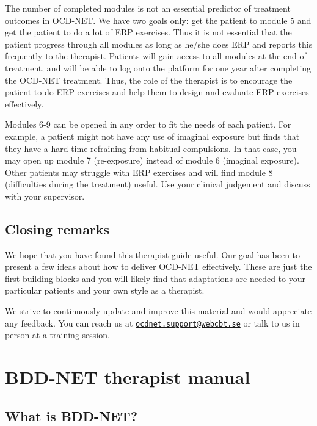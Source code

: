 \documentclass[]{book}
\theoremstyle{definition}
\theoremstyle{definition}
\theoremstyle{definition}
\theoremstyle{remark}
\begin{document}
The number of completed modules is not an essential predictor of
treatment outcomes in OCD-NET. We have two goals only: get the patient
to module 5 and get the patient to do a lot of ERP exercises. Thus it is
not essential that the patient progress through all modules as long as
he/she does ERP and reports this frequently to the therapist. Patients
will gain access to all modules at the end of treatment, and will be
able to log onto the platform for one year after completing the OCD-NET
treatment. Thus, the role of the therapist is to encourage the patient
to do ERP exercises and help them to design and evaluate ERP exercises
effectively.

Modules 6-9 can be opened in any order to fit the needs of each patient.
For example, a patient might not have any use of imaginal exposure but
finds that they have a hard time refraining from habitual compulsions.
In that case, you may open up module 7 (re-exposure) instead of module 6
(imaginal exposure). Other patients may struggle with ERP exercises and
will find module 8 (difficulties during the treatment) useful. Use your
clinical judgement and discuss with your supervisor.

\hypertarget{closing-remarks}{%
\section{Closing remarks}\label{closing-remarks}}

We hope that you have found this therapist guide useful. Our goal has
been to present a few ideas about how to deliver OCD-NET effectively.
These are just the first building blocks and you will likely find that
adaptations are needed to your particular patients and your own style as
a therapist.

We strive to continuously update and improve this material and would
appreciate any feedback. You can reach us at
\href{mailto:ocdnet.support@webcbt.se}{\nolinkurl{ocdnet.support@webcbt.se}}
or talk to us in person at a training session.

\hypertarget{bdd-net-therapist-manual}{%
\chapter{BDD-NET therapist manual}\label{bdd-net-therapist-manual}}

\hypertarget{what-is-bdd-net}{%
\section{What is BDD-NET?}\label{what-is-bdd-net}}
\end{document}
